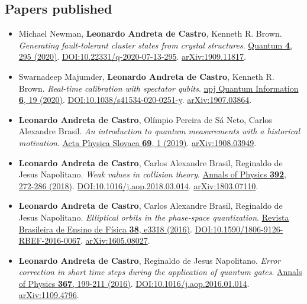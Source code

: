 \documentclass[a4paper]{article}
\begin{document}
\subsection*{Papers published}
\begin{itemize} \item[]  Michael Newman, \textbf{Leonardo Andreta de Castro}, Kenneth R. Brown. \textit{Generating fault-tolerant cluster states from crystal structures}. \href{https://quantum-journal.org/papers/q-2020-07-13-295}{ Quantum \textbf{4}, 295 (2020)}. \href{https://doi.org/10.22331/q-2020-07-13-295}{DOI:10.22331/q-2020-07-13-295}. \href{https://arxiv.org/abs/1909.11817}{arXiv:1909.11817}.  
\item[]  Swarnadeep Majumder, \textbf{Leonardo Andreta de Castro}, Kenneth R. Brown. \textit{Real-time calibration with spectator qubits}. \href{https://www.nature.com/articles/s41534-020-0251-y}{ npj Quantum Information \textbf{6}, 19 (2020)}. \href{https://doi.org/10.1038/s41534-020-0251-y}{DOI:10.1038/s41534-020-0251-y}. \href{https://arxiv.org/abs/1907.03864}{arXiv:1907.03864}.  
\item[]  \textbf{Leonardo Andreta de Castro}, Olímpio Pereira de Sá Neto, Carlos Alexandre Brasil. \textit{An introduction to quantum measurements with a historical motivation}. \href{http://www.physics.sk/aps/pub.php?y=2019&pub=aps-19-01}{ Acta Physica Slovaca \textbf{69}, 1 (2019)}. \href{https://arxiv.org/abs/1908.03949}{arXiv:1908.03949}.  
\item[]  \textbf{Leonardo Andreta de Castro}, Carlos Alexandre Brasil, Reginaldo de Jesus Napolitano. \textit{Weak values in collision theory}. \href{https://www.sciencedirect.com/science/article/abs/pii/S0003491618300691}{ Annals of Physics \textbf{392}, 272-286 (2018)}. \href{https://doi.org/10.1016/j.aop.2018.03.014}{DOI:10.1016/j.aop.2018.03.014}. \href{https://arxiv.org/abs/1803.07110}{arXiv:1803.07110}.  
\item[]  \textbf{Leonardo Andreta de Castro}, Carlos Alexandre Brasil, Reginaldo de Jesus Napolitano. \textit{Elliptical orbits in the phase-space quantization}. \href{https://www.scielo.br/scielo.php?script=sci_arttext&pid=S1806-11172016000300418}{ Revista Brasileira de Ensino de Física \textbf{38}, e3318 (2016)}. \href{https://doi.org/10.1590/1806-9126-RBEF-2016-0067}{DOI:10.1590/1806-9126-RBEF-2016-0067}. \href{https://arxiv.org/abs/1605.08027}{arXiv:1605.08027}.  
\item[]  \textbf{Leonardo Andreta de Castro}, Reginaldo de Jesus Napolitano. \textit{Error correction in short time steps during the application of quantum gates}. \href{https://www.sciencedirect.com/science/article/abs/pii/S0003491616000257}{ Annals of Physics \textbf{367}, 199-211 (2016)}. \href{https://doi.org/10.1016/j.aop.2016.01.014}{DOI:10.1016/j.aop.2016.01.014}. \href{https://arxiv.org/abs/1109.4796}{arXiv:1109.4796}.  

\end{itemize}
\end{document}
